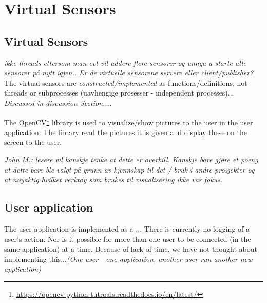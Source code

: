 \documentclass[USenglish]{uit-thesis}
\begin{document}
\section{Virtual Sensors} \label{ssec:imp_virsens}
\subsection{Virtual Sensors} \label{vsensor}
\textit{ikke threads ettersom man evt vil addere flere sensorer og unnga a starte alle sensorer på nytt igjen..
Er de virtuelle sensorene servere eller client/publisher?}
The virtual sensors are \textit{constructed/implemented} as functions/definitions, not threads or subprocesses (uavhengige prosesser - independent processes)... \textit{Discussed in discussion Section....}

The OpenCV\footnote{\url{https://opencv-python-tutroals.readthedocs.io/en/latest/}} library is used to visualize/show pictures to the user in the user application. The library read the pictures it is given and display these on the screen to the user.

\textit{John M.: lesere vil kanskje tenke at dette er overkill. Kanskje bare gjøre et poeng at dette bare ble valgt på grunn av kjennskap til det / bruk i andre prosjekter og at nøyaktig hvilket verktøy som brukes til visualisering ikke var fokus.}



\subsection{User application} \label{sssec:user}
The user application is implemented as a ...
There is currently no logging of a user's action. Nor is it possible for more than one user to be connected (in the same application) at a time. Because of lack of time, we have not thought about implementing this...\textit{(One user - one application, another user run another new application)}
\end{document}
